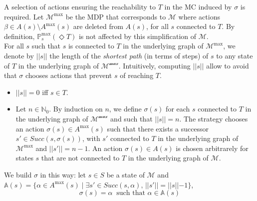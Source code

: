 A selection of actions ensuring
the reachability to $T$ in the
MC induced by $\sigma$ is required.
Let $\mathcal{M}^{\max}$ be the MDP that corresponds to $\mathcal{M}$
where actions $\beta \in A(s) \setminus A^{\max}(s)$ are deleted from $A(s)$,
for all $s$ connected to $T$.
By definition, $\mathbb{P}^{\max}_s(\Diamond T)$ is not affected by this simplification of
$\mathcal{M}$. \\

For all $s$ such that $s$ is connected to $T$ in the underlying graph of
$\mathcal{M}^{\max}$, we denote by $||s||$ the length of the \textit{shortest path} (in terms of steps) of $s$ to any state of $T$ in the underlying graph of
$\mathcal{M^{\max}}$. Intuitively, computing $||s||$ allow to avoid that $\sigma$ chooses
actions that prevent $s$ of reaching $T$.
\begin{itemize}
	\renewcommand{\labelitemi}{\tiny$\bullet$}
	\item $||s|| = 0$ iff $s \in T$.
	\item Let $n \in \mathbb{N}_0$. By induction on $n$, we define
		$\sigma(s)$ for each $s$ connected to $T$ in the underlying graph of
		$\mathcal{M^{\max}}$ and such that $||s|| = n$.
		The strategy chooses an action $\sigma(s) \in A^{\max}(s)$ such that there exists a successor $s' \in Succ(s, \sigma(s))$, with $s'$ connected to $T$ in the underlying graph of
		$\mathcal{M}^{\max}$ and $||s'|| = n - 1$. An action $\sigma(s) \in A(s)$ is chosen
		arbitrarely for states $s$ that are not connected to $T$ in the underlying graph of $\mathcal{M}$.
\end{itemize}
We build $\sigma$ in this way: let $s \in S$ be a state of $\mathcal{M}$ and $\mathbb{A}(s) = \{\alpha \in A^{\max}(s) \; | \; \exists s' \in Succ(s,
	\alpha), \, ||s'|| = ||s|| - 1 \}$,
\[
	\sigma(s) = \alpha \;\; \text{such that } \alpha \in \mathbb{A}(s)
\]


